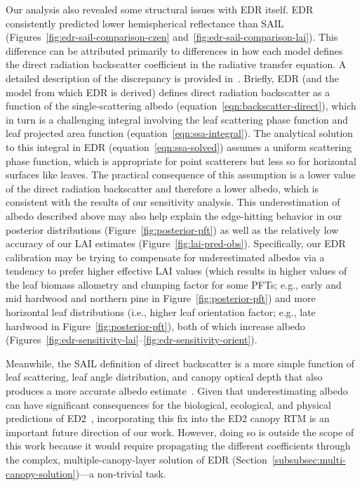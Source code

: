 Our analysis also revealed some structural issues with EDR itself.
EDR consistently predicted lower hemispherical reflectance than SAIL (Figures~\ref{fig:edr-sail-comparison-czen} and~\ref{fig:edr-sail-comparison-lai}).
This difference can be attributed primarily to differences in how each model defines the direct radiation backscatter coefficient in the radiative transfer equation.
A detailed description of the discrepancy is provided in~\citet{yuan2017reexamination}.
Briefly, EDR (and the \citealt{sellers1985canopy} model from which EDR is derived) defines direct radiation backscatter as a function of the single-scattering albedo (equation~\ref{eqn:backscatter-direct}),
which in turn is a challenging integral involving the leaf scattering phase function and leaf projected area function (equation~\ref{eqn:ssa-integral}).
The analytical solution to this integral in EDR (equation~\ref{eqn:ssa-solved}) assumes a uniform scattering phase function, which is appropriate for point scatterers but less so for horizontal surfaces like leaves.
The practical consequence of this assumption is a lower value of the direct radiation backscatter and therefore a lower albedo, which is consistent with the results of our sensitivity analysis.
This underestimation of albedo described above may also help explain the edge-hitting behavior in our posterior distributions (Figure~\ref{fig:posterior-pft}) as well as the relatively low accuracy of our LAI estimates (Figure~\ref{fig:lai-pred-obs}).
Specifically, our EDR calibration may be trying to compensate for underestimated albedos via a tendency to prefer
higher effective LAI values (which results in higher values of the leaf biomass allometry and clumping factor for some PFTs; e.g., early and mid hardwood and northern pine in Figure~\ref{fig:posterior-pft}) and
more horizontal leaf distributions (i.e., higher leaf orientation factor; e.g., late hardwood in Figure~\ref{fig:posterior-pft}), both of which increase albedo (Figures~\ref{fig:edr-sensitivity-lai}--\ref{fig:edr-sensitivity-orient}).

Meanwhile, the SAIL definition of direct backscatter is a more simple function of leaf scattering, leaf angle distribution, and canopy optical depth that also produces a more accurate albedo estimate~\citep{yuan2017reexamination}.
Given that underestimating albedo can have significant consequences for the biological, ecological, and physical predictions of ED2~\citep{viskari_2019_influence}, incorporating this fix into the ED2 canopy RTM is an important future direction of our work.
However, doing so is outside the scope of this work because it would require propagating the different coefficients through the complex, multiple-canopy-layer solution of EDR (Section~\ref{subsubsec:multi-canopy-solution})---a non-trivial task.

